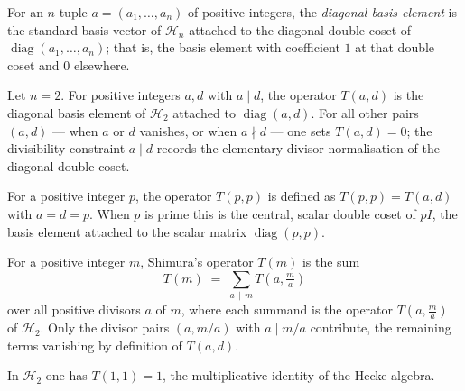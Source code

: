 \begin{definition}\label{def:T-elem}
\leanok
For an $n$-tuple $a=(a_1,\dots,a_n)$ of positive integers, the \emph{diagonal basis element}
is the standard basis vector of $\mathcal{H}_n$ attached to the diagonal double coset of
$\operatorname{diag}(a_1,\dots,a_n)$; that is, the basis element with coefficient $1$ at that
double coset and $0$ elsewhere.
\end{definition}

\begin{definition}[$T(a,d)$]\label{def:T-ad}
\leanok
Let $n=2$. For positive integers $a,d$ with $a\mid d$, the operator $T(a,d)$ is the diagonal
basis element of $\mathcal{H}_2$ attached to $\operatorname{diag}(a,d)$. For all other pairs
$(a,d)$ — when $a$ or $d$ vanishes, or when $a\nmid d$ — one sets $T(a,d)=0$; the
divisibility constraint $a\mid d$ records the elementary-divisor normalisation of the
diagonal double coset.
\end{definition}

\begin{definition}[$T(p,p)$]\label{def:T-pp}
\leanok
For a positive integer $p$, the operator $T(p,p)$ is defined as $T(p,p)=T(a,d)$ with $a=d=p$.
When $p$ is prime this is the central, scalar double coset of $pI$, the basis element attached
to the scalar matrix $\operatorname{diag}(p,p)$.
\end{definition}

\begin{definition}[$T(m)$]\label{def:T-sum}
\leanok
For a positive integer $m$, Shimura's operator $T(m)$ is the sum
\[
  T(m) \;=\; \sum_{a\,\mid\, m} T\!\left(a,\tfrac{m}{a}\right)
\]
over all positive divisors $a$ of $m$, where each summand is the operator
$T\!\left(a,\tfrac{m}{a}\right)$ of $\mathcal{H}_2$. Only the divisor pairs $(a,m/a)$ with
$a\mid m/a$ contribute, the remaining terms vanishing by definition of $T(a,d)$.
\end{definition}

\begin{lemma}\label{lem:T-ad-one-one}
\leanok
In $\mathcal{H}_2$ one has $T(1,1)=1$, the multiplicative identity of the Hecke algebra.
\end{lemma}

